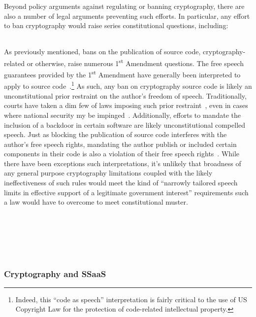 Beyond policy arguments against regulating or banning cryptography, there
are also a number of legal arguments preventing such efforts. In
particular, any effort to ban cryptography would raise series
constitutional questions, including:

\begin{packed_desc}
\item[1\textsuperscript{st} Amendment] \hfill \\ As previously
  mentioned, bans on the publication of source code,
  cryptography-related or otherwise, raise numerous
  1\textsuperscript{st} Amendment questions. The free speech
  guarantees provided by the 1\textsuperscript{st} Amendment have
  generally been interpreted to apply to source
  code~\cite{ninthcir-bernstein, sixthcir-junger}.\footnote{Indeed,
    this ``code as speech'' interpretation is fairly critical to the
    use of US Copyright Law for the protection of code-related
    intellectual property.} As such, any ban on cryptography source
  code is likely an unconstitutional prior restraint on the author's
  freedom of speech. Traditionally, courts have taken a dim few of
  laws imposing such prior restraint~\cite{scotus-nearvminnesota},
  even in cases where national security my be
  impinged~\cite{scotus-nytvus}. Additionally, efforts to mandate the
  inclusion of a backdoor in certain software are likely
  unconstitutional compelled speech. Just as blocking the publication
  of source code interferes with the author's free speech rights,
  mandating the author publish or included certain components in their
  code is also a violation of their free speech
  rights~\cite{scotus-wooleyvmaynard}. While there have been
  exceptions such interpretations, it's unlikely that broadness of any
  general purpose cryptography limitations coupled with the likely
  ineffectiveness of such rules would meet the kind of ``narrowly
  tailored speech limits in effective support of a legitimate
  government interest'' requirements such a law would have to overcome
  to meet constitutional muster.
\item[2\textsuperscript{nd} Amendment] \hfill \\ 
\item[4\textsuperscript{th} Amendment] \hfill \\ 
\item[5\textsuperscript{th} Amendment] \hfill \\ 
\end{packed_desc}

\subsubsection{Cryptography and SSaaS}

